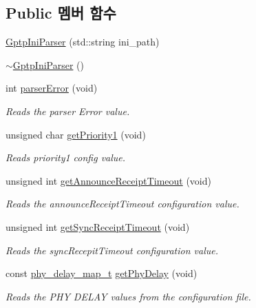 \subsection*{Public 멤버 함수}
\begin{DoxyCompactItemize}
\item 
\hyperlink{class_gptp_ini_parser_a116aa4d012c6d6bb05c161423d0c24e4}{Gptp\+Ini\+Parser} (std\+::string ini\+\_\+path)
\item 
\hyperlink{class_gptp_ini_parser_ace0d77ce91e98e008d6b569b1704ec4f}{$\sim$\+Gptp\+Ini\+Parser} ()
\item 
int \hyperlink{class_gptp_ini_parser_a36ee2593041cc0ebec9abccfb4b24dc7}{parser\+Error} (void)
\begin{DoxyCompactList}\small\item\em Reads the parser Error value. \end{DoxyCompactList}\item 
unsigned char \hyperlink{class_gptp_ini_parser_a3577d05b0d34d976c23354585d7516ad}{get\+Priority1} (void)
\begin{DoxyCompactList}\small\item\em Reads priority1 config value. \end{DoxyCompactList}\item 
unsigned int \hyperlink{class_gptp_ini_parser_a7c2a185fe191258e9f88d2da09c521b2}{get\+Announce\+Receipt\+Timeout} (void)
\begin{DoxyCompactList}\small\item\em Reads the announce\+Receipt\+Timeout configuration value. \end{DoxyCompactList}\item 
unsigned int \hyperlink{class_gptp_ini_parser_afe0d5fffcbecb71f2c024507e7bb1c31}{get\+Sync\+Receipt\+Timeout} (void)
\begin{DoxyCompactList}\small\item\em Reads the sync\+Recepit\+Timeout configuration value. \end{DoxyCompactList}\item 
const \hyperlink{common__port_8hpp_a3fdbc1f6eb18af9243571ba14c1e1f63}{phy\+\_\+delay\+\_\+map\+\_\+t} \hyperlink{class_gptp_ini_parser_aa8421959bca3a4e1bb56c2a515695d65}{get\+Phy\+Delay} (void)
\begin{DoxyCompactList}\small\item\em Reads the P\+HY D\+E\+L\+AY values from the configuration file. \end{DoxyCompactList}\item 

\end{DoxyCompactItemize}
